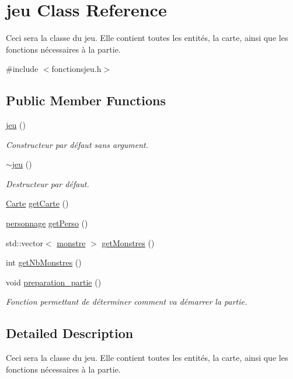 \hypertarget{classjeu}{}\section{jeu Class Reference}
\label{classjeu}


Ceci sera la classe du jeu. Elle contient toutes les entités, la carte, ainsi que les fonctions nécessaires à la partie.  




{\ttfamily \#include $<$fonctionsjeu.\+h$>$}

\subsection*{Public Member Functions}
\begin{DoxyCompactItemize}
\item 
\hyperlink{classjeu_a38513a7bfd0a7ea4e3a5612da2856016}{jeu} ()
\begin{DoxyCompactList}\small\item\em Constructeur par défaut sans argument. \end{DoxyCompactList}\item 
\hyperlink{classjeu_a55385a33ef40e0579eb3a3634566c4a8}{$\sim$jeu} ()
\begin{DoxyCompactList}\small\item\em Destructeur par défaut. \end{DoxyCompactList}\item 
\hyperlink{class_carte}{Carte} \hyperlink{classjeu_ae2e46e1fdeb23fc643ed506b0df7f21f}{get\+Carte} ()
\item 
\hyperlink{classpersonnage}{personnage} \hyperlink{classjeu_a8bd58d1469db0d7595bb732403036823}{get\+Perso} ()
\item 
std\+::vector$<$ \hyperlink{classmonstre}{monstre} $>$ \hyperlink{classjeu_a22e7a7e7b932b935fa73658820038176}{get\+Monstres} ()
\item 
int \hyperlink{classjeu_ae172cfaf3e5c97e1576dc4069d48ec94}{get\+Nb\+Monstres} ()
\item 
void \hyperlink{classjeu_adf5ffb1565eebcd8540ff1ef4626abaf}{preparation\+\_\+partie} ()
\begin{DoxyCompactList}\small\item\em Fonction permettant de déterminer comment va démarrer la partie. \end{DoxyCompactList}\end{DoxyCompactItemize}


\subsection{Detailed Description}
Ceci sera la classe du jeu. Elle contient toutes les entités, la carte, ainsi que les fonctions nécessaires à la partie. 

